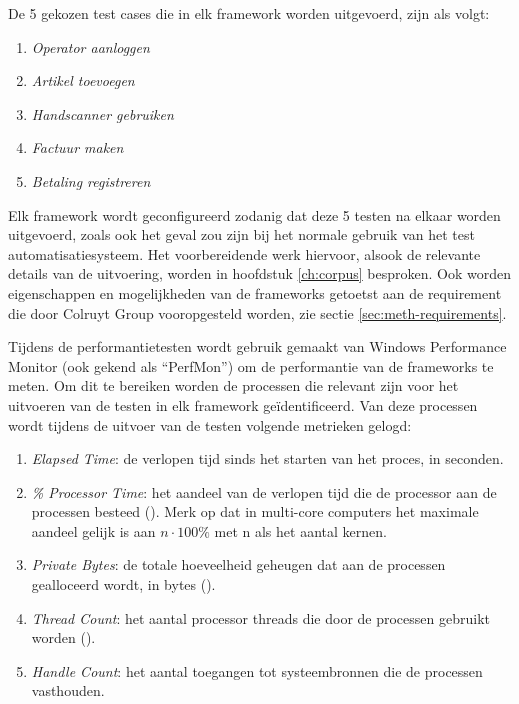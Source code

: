 De 5 gekozen test cases die in elk framework worden uitgevoerd, zijn als volgt:

\begin{enumerate}
    \item \emph{Operator aanloggen}
    \item \emph{Artikel toevoegen}
    \item \emph{Handscanner gebruiken}
    \item \emph{Factuur maken}
    \item \emph{Betaling registreren}
\end{enumerate}


Elk framework wordt geconfigureerd zodanig dat deze 5 testen na elkaar worden uitgevoerd, zoals ook het geval zou zijn bij het normale gebruik van het test automatisatiesysteem. Het voorbereidende werk hiervoor, alsook de relevante details van de uitvoering, worden in hoofdstuk \ref{ch:corpus} besproken. Ook worden eigenschappen en mogelijkheden van de frameworks getoetst aan de requirement die door Colruyt Group vooropgesteld worden, zie sectie \ref{sec:meth-requirements}.

Tijdens de performantietesten wordt gebruik gemaakt van Windows \textsuperscript{\textregistered} Performance Monitor (ook gekend als ``PerfMon'') om de performantie van de frameworks te meten. Om dit te bereiken worden de processen die relevant zijn voor het uitvoeren van de testen in elk framework geïdentificeerd. Van deze processen wordt tijdens de uitvoer van de testen volgende metrieken gelogd:

\begin{enumerate}
    \item \emph{Elapsed Time}: de verlopen tijd sinds het starten van het proces, in seconden.
    \item \emph{\% Processor Time}: het aandeel van de verlopen tijd die de processor aan de processen besteed (\cite{Tarra2014}). Merk op dat in multi-core computers het maximale aandeel gelijk is aan \( n \cdot 100\% \) met n als het aantal kernen.
    \item \emph{Private Bytes}: de totale hoeveelheid geheugen dat aan de processen gealloceerd wordt, in bytes (\cite{Hudek2017}).
    \item \emph{Thread Count}: het aantal processor threads die door de processen gebruikt worden (\cite{Satran2018}).
    \item \emph{Handle Count}: het aantal toegangen tot systeembronnen die de processen vasthouden.
\end{enumerate}

